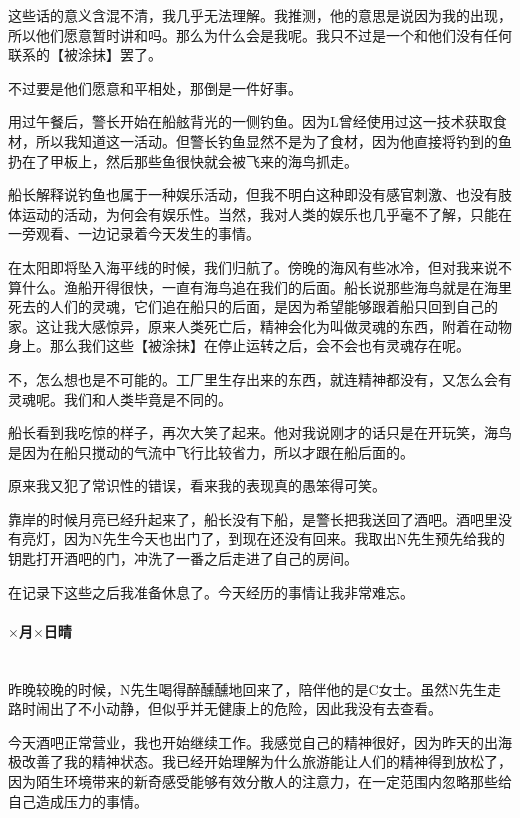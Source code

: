 这些话的意义含混不清，我几乎无法理解。我推测，他的意思是说因为我的出现，所以他们愿意暂时讲和吗。那么为什么会是我呢。我只不过是一个和他们没有任何联系的【被涂抹】罢了。

不过要是他们愿意和平相处，那倒是一件好事。

用过午餐后，警长开始在船舷背光的一侧钓鱼。因为L曾经使用过这一技术获取食材，所以我知道这一活动。但警长钓鱼显然不是为了食材，因为他直接将钓到的鱼扔在了甲板上，然后那些鱼很快就会被飞来的海鸟抓走。

船长解释说钓鱼也属于一种娱乐活动，但我不明白这种即没有感官刺激、也没有肢体运动的活动，为何会有娱乐性。当然，我对人类的娱乐也几乎毫不了解，只能在一旁观看、一边记录着今天发生的事情。

在太阳即将坠入海平线的时候，我们归航了。傍晚的海风有些冰冷，但对我来说不算什么。渔船开得很快，一直有海鸟追在我们的后面。船长说那些海鸟就是在海里死去的人们的灵魂，它们追在船只的后面，是因为希望能够跟着船只回到自己的家。这让我大感惊异，原来人类死亡后，精神会化为叫做灵魂的东西，附着在动物身上。那么我们这些【被涂抹】在停止运转之后，会不会也有灵魂存在呢。

不，怎么想也是不可能的。工厂里生存出来的东西，就连精神都没有，又怎么会有灵魂呢。我们和人类毕竟是不同的。

船长看到我吃惊的样子，再次大笑了起来。他对我说刚才的话只是在开玩笑，海鸟是因为在船只搅动的气流中飞行比较省力，所以才跟在船后面的。

原来我又犯了常识性的错误，看来我的表现真的愚笨得可笑。

靠岸的时候月亮已经升起来了，船长没有下船，是警长把我送回了酒吧。酒吧里没有亮灯，因为N先生今天也出门了，到现在还没有回来。我取出N先生预先给我的钥匙打开酒吧的门，冲洗了一番之后走进了自己的房间。

在记录下这些之后我准备休息了。今天经历的事情让我非常难忘。

\par

\paragraph*{$\times$月$\times$日\quad 晴}\mbox{}\\

昨晚较晚的时候，N先生喝得醉醺醺地回来了，陪伴他的是C女士。虽然N先生走路时闹出了不小动静，但似乎并无健康上的危险，因此我没有去查看。

今天酒吧正常营业，我也开始继续工作。我感觉自己的精神很好，因为昨天的出海极改善了我的精神状态。我已经开始理解为什么旅游能让人们的精神得到放松了，因为陌生环境带来的新奇感受能够有效分散人的注意力，在一定范围内忽略那些给自己造成压力的事情。

